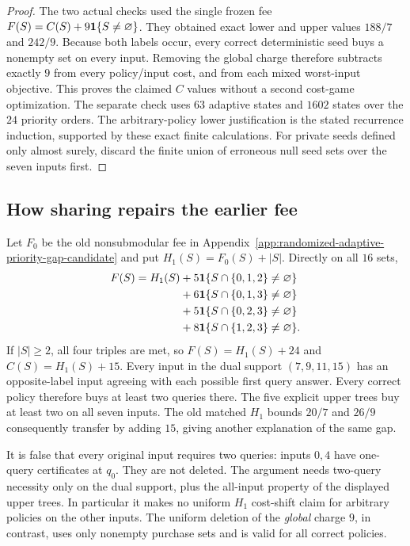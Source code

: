 \begin{proof}
The two actual checks used the single frozen fee
$F(S)=C(S)+9{\bf1}\{S\ne\varnothing\}$. They obtained exact lower
and upper values $188/7$ and $242/9$. Because both labels occur, every
correct deterministic seed buys a nonempty set on every input. Removing
the global charge therefore subtracts exactly $9$ from every policy/input
cost, and from each mixed worst-input objective. This proves the claimed
$C$ values without a second cost-game optimization. The separate check
uses $63$ adaptive states and $1602$ states over the $24$ priority orders.
The arbitrary-policy lower justification is the stated recurrence
induction, supported by these exact finite calculations.
For private seeds defined only almost surely, discard the finite union
of erroneous null seed sets over the seven inputs first.
\end{proof}

\subsection{How sharing repairs the earlier fee}
Let $F_0$ be the old nonsubmodular fee in
Appendix~\ref{app:randomized-adaptive-priority-gap-candidate} and put
$H_1(S)=F_0(S)+|S|$. Directly on all $16$ sets,
\begin{align*}
 F(S)=H_1(S)&+5{\bf1}\{S\cap\{0,1,2\}\ne\varnothing\}\\
 &+6{\bf1}\{S\cap\{0,1,3\}\ne\varnothing\}\\
 &+5{\bf1}\{S\cap\{0,2,3\}\ne\varnothing\}\\
 &+8{\bf1}\{S\cap\{1,2,3\}\ne\varnothing\}.
\end{align*}
If $|S|\geq2$, all four triples are met, so $F(S)=H_1(S)+24$ and
$C(S)=H_1(S)+15$. Every input in the dual support $(7,9,11,15)$
has an opposite-label input agreeing with each possible first query
answer. Every correct policy therefore buys at least two queries there.
The five explicit upper trees buy at least two on all seven inputs.
The old matched $H_1$ bounds $20/7$ and $26/9$ consequently transfer
by adding $15$, giving another explanation of the same gap.

It is false that every original input requires two queries: inputs
$0,4$ have one-query certificates at $q_0$. They are not deleted. The
argument needs two-query necessity only on the dual support, plus the
all-input property of the displayed upper trees. In particular it makes
no uniform $H_1$ cost-shift claim for arbitrary policies on the other
inputs. The uniform deletion of the \emph{global} charge $9$, in contrast,
uses only nonempty purchase sets and is valid for all correct policies.

